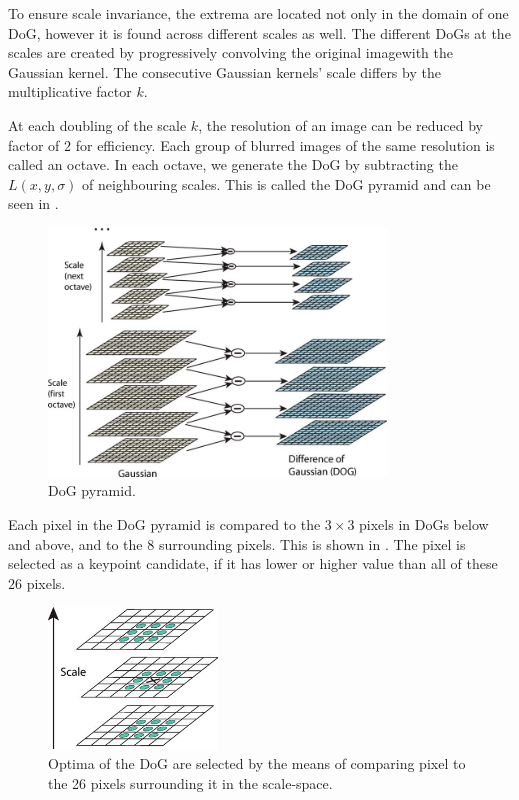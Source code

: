 To ensure scale invariance, the extrema are located not only in the domain of one DoG, however it is found across different scales as well. The different DoGs at the scales are created by progressively convolving the original imagewith the Gaussian kernel. The consecutive Gaussian kernels' scale differs by the multiplicative factor $k$.

At each doubling of the scale $k$, the resolution of an image can be reduced by factor of $2$ for efficiency. Each group of blurred images of the same resolution is called an octave. In each octave, we generate the DoG by subtracting the $L(x, y, \sigma)$ of neighbouring scales. This is called the DoG pyramid and can be seen in .

\begin{figure}
    \centering
    \includegraphics[width=0.8\textwidth]{Figures/sift/pyramid.jpg}
    \caption[DoG pyramid.]{DoG pyramid. \cite{Lowe2004}}
    \label{fig:DoG_pyramid}
\end{figure}

Each pixel in the DoG pyramid is compared to the $3\times3$ pixels in DoGs below and above, and to the $8$ surrounding pixels. This is shown in . The pixel is selected as a keypoint candidate, if it has lower or higher value than all of these $26$ pixels.

\begin{figure}
    \centering
    \includegraphics[width=0.4\textwidth]{Figures/sift/extrema.jpg}
    \caption[Optima of the DoG are selected by the means of comparing pixel to the 26 pixels surrounding it in the scale-space.]{Optima of the DoG are selected by the means of comparing pixel to the 26 pixels surrounding it in the scale-space. \cite{Lowe2004}}
    \label{fig:DoG_extrema}
\end{figure}

